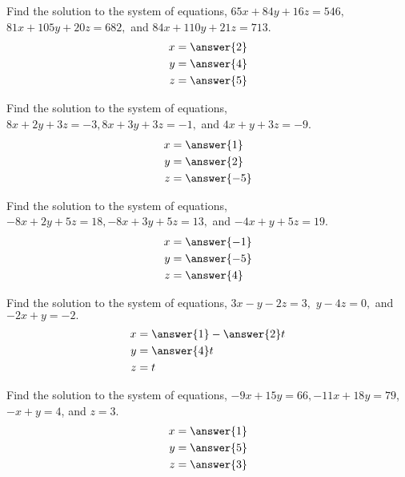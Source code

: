 \documentclass{ximera}
\begin{document}
\begin{problem}\label{prb:2.33} Find the solution to the system of equations,
$65x+84y+16z=546,$ $81x+105y+20z=682,$ and $84x+110y+21z=713.$
 \begin{align*}
 x&=\answer{2}\\
 y&=\answer{4}\\
 z&=\answer{5}\\
 \end{align*}
\end{problem}

\begin{problem}\label{prb:2.34} Find the solution to the system of equations,
$8x+2y+3z=-3,8x+3y+3z=-1,$ and $4x+y+3z=-9.$
 \begin{align*}
 x&=\answer{1}\\
 y&=\answer{2}\\
 z&=\answer{-5}\\
 \end{align*}
\end{problem}

\begin{problem}\label{prb:2.35} Find the solution to the system of equations,
$-8x+2y+5z=18,-8x+3y+5z=13,$ and $-4x+y+5z=19.$
 \begin{align*}
 x&=\answer{-1}\\
 y&=\answer{-5}\\
 z&=\answer{4}\\
 \end{align*}
\end{problem}

\begin{problem}\label{prb:2.36} Find the solution to the system of equations, $3x-y-2z=3,$
$y-4z=0,$ and $-2x+y=-2.$
 \begin{align*}
 x&=\answer{1}-\answer{2}t\\
 y&=\answer{4}t\\
 z&=t\\
 \end{align*}
\end{problem}

\begin{problem}\label{prb:2.37} Find the solution to the system of equations,
$-9x+15y=66,-11x+18y=79$, $-x+y=4$, and $z=3$.
 \begin{align*}
 x&=\answer{1}\\
 y&=\answer{5}\\
 z&=\answer{3}\\
 \end{align*}
\end{problem}
\end{document}
